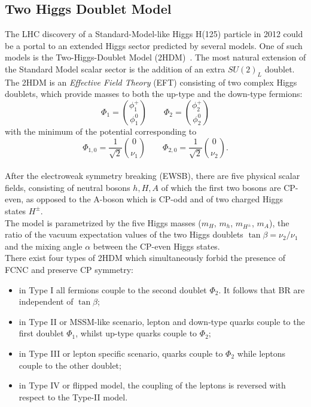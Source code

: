 \subsection{Two Higgs Doublet Model}
The LHC discovery of a Standard-Model-like Higgs H(125) particle in 2012\cite{higgsDiscovery} could be a portal to an extended Higgs sector predicted by several models. One of such models is the Two-Higgs-Doublet Model (2HDM)~\cite{h2dm}.
The most natural extension of the Standard Model scalar sector is the addition of an
extra $SU(2)_{L}$ doublet. 
\vspace{\baselineskip}
\\The 2HDM is an \textit{Effective Field Theory} (EFT\footnotemark) 
consisting of two complex Higgs doublets, which provide masses to both the up-type and the down-type fermions:
\begin{equation} 
	\Phi_{1}= \binom{\phi^{+}_{1}}{\phi^{0}_{1}}  \qquad \Phi_{2}= \binom{\phi^{+}_{2}}{\phi^{0}_{2}}
\end{equation}
with the minimum of the potential corresponding to
\begin{equation} 
	\Phi_{1,0}= \frac{1}{\sqrt{2}}\binom{0}{\nu_1}  \qquad \Phi_{2,0}= \frac{1}{\sqrt{2}}\binom{0}{\nu_2}.
\end{equation}
\\After the electroweak symmetry breaking (EWSB),
there are five physical scalar fields, consisting of neutral bosons $h,H,A$ of which the
first two bosons are CP-even, as opposed to the A-boson which is CP-odd and of two charged Higgs states $H^{\pm}$.
\\The model is parametrized by the five Higgs masses ($m_H$, $m_h$, $m_{H^{\pm}}$, $m_A$), the ratio of the vacuum expectation 
values of the two Higgs doublets $\tan{\beta}= \nu_{2}/\nu_{1}$ and the mixing angle $\alpha$ between the CP-even Higgs states.
\\There exist four types of 2HDM which simultaneously forbid the presence of FCNC and preserve CP symmetry:
\begin{itemize}
	\item in Type I all fermions couple to the second doublet $\Phi_2$. It follows that BR are independent of $\tan{\beta}$;
	\item in Type II or MSSM-like scenario, lepton and down-type quarks couple to the first doublet $\Phi_1$, whilst up-type quarks couple to $\Phi_2$;
	\item in Type III or lepton specific scenario, quarks couple to  $\Phi_2$ while leptons couple to the other doublet;
	\item in Type IV or flipped model, the coupling of the leptons is reversed with respect to the Type-II model.
\end{itemize}	
	
